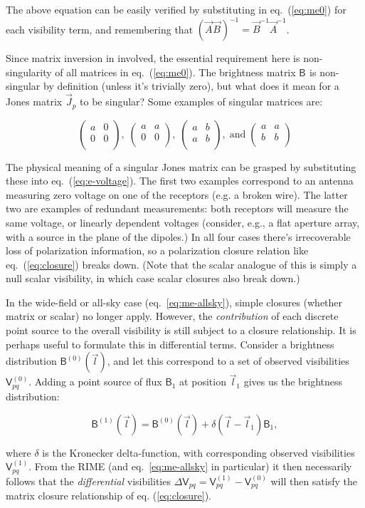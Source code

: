 \documentclass[]{aa}
\newcommand{\matrixtt}[4]{\left( \begin{array}{cc}#1&#2\\#3&#4\\\end{array} \right)}
\newcommand{\jones}[2]{\vec {#1}_{#2}}
\newcommand{\jonesinv}[2]{\vec {#1}^{-1}_{#2}}
\newcommand{\coh}[2]{\mathsf{{#1}}_{{#2}}}
\begin{document}
The above equation can be easily verified by substituting in eq.~(\ref{eq:me0}) for each visibility term, and remembering that $(\jones{A}{}\jones{B}{})^{-1}=\jonesinv{B}{}\jonesinv{A}{}$. 

Since matrix inversion in involved, the essential requirement here is non-singularity of all matrices in eq.~(\ref{eq:me0}). The brightness matrix $\coh{B}{}$ is non-singular by definition (unless it's trivially zero), but what does it mean for a Jones matrix $\jones{J}{p}$ to be singular? Some examples of singular matrices are:

\[
\matrixtt{a}{0}{0}{0}, \; \matrixtt{a}{a}{0}{0}, \; \matrixtt{a}{b}{a}{b},\; \mathrm{and} \; \matrixtt{a}{a}{b}{b}
\]

The physical meaning of a singular Jones matrix can be grasped by substituting these into eq.~(\ref{eq:e-voltage}). The first two examples correspond to an antenna measuring zero voltage on one of the receptors (e.g. a broken wire). The latter two are examples of redundant measurements: both receptors will measure the same voltage, or linearly dependent voltages (consider, e.g., a flat aperture array, with a source in the plane of the dipoles.) In all four cases there's irrecoverable loss of polarization information, so a polarization closure relation like eq.~(\ref{eq:closure}) breaks down. (Note that the scalar analogue of this is simply a null scalar visibility, in which case scalar closures also break down.)

In the wide-field or all-sky case (eq.~\ref{eq:me-allsky}), simple closures (whether matrix or scalar) no longer apply. However, the \emph{contribution} of each discrete point source to the overall visibility is still subject to a closure relationship. It is perhaps useful to formulate this in differential terms. Consider a brightness distribution $\coh{B}{}^{(0)}(\vec l)$, and let this correspond to a set of observed visibilities $\coh{V}{pq}^{(0)}$. Adding a point source of flux $\coh{B}{1}$ at position $\vec l_1$ gives us the brightness distribution:

\[
\coh{B}{}^{(1)}(\vec l) = \coh{B}{}^{(0)}(\vec l)+\delta(\vec l - \vec l_1)\coh{B}{1},
\]

where $\delta$ is the Kronecker delta-function, with corresponding observed visibilities $\coh{V}{pq}^{(1)}$. From the RIME (and eq.~\ref{eq:me-allsky} in particular) it then necessarily follows that the \emph{differential} visibilities $\Delta\coh{V}{pq}=\coh{V}{pq}^{(1)} - \coh{V}{pq}^{(0)}$ will then satisfy the matrix closure relationship of eq. (\ref{eq:closure}).
\end{document}
